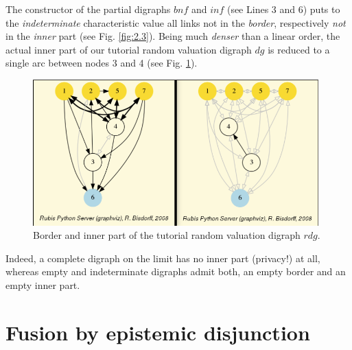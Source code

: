 The constructor of the partial digraphs $bnf$ and $inf$  (see Lines 3 and 6) puts to the \emph{indeterminate} characteristic value all links not in the \emph{border}, respectively \emph{not} in the \emph{inner} part (see Fig. \ref{fig:2.3}). Being much {\em denser\/} than a linear order, the actual inner part of our tutorial random valuation digraph $dg$ is reduced to a single arc between nodes 3 and 4 (see Fig. \ref{fig:2.4}).
\begin{figure}[h]
\includegraphics[width=11cm]{Figures/graphBorderAndInner.png}
\caption{Border and inner part of the tutorial random valuation digraph $rdg$.}
\label{fig:2.4}       %
\end{figure}
Indeed, a complete digraph on the limit has no inner part (privacy!) at all, whereas empty and indeterminate digraphs admit both, an empty border and an empty inner part.

\section{Fusion by epistemic disjunction}
\label{sec:2.5}

